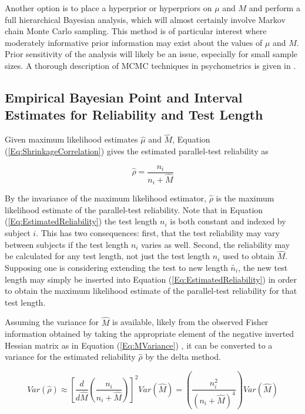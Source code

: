 \documentclass[12pt,epsfig]{article}
\begin{document}
 Another option is to place a hyperprior or hyperpriors on $\mu$ and $M$ and perform a full hierarchical Bayesian analysis, which will almost certainly involve Markov chain Monte Carlo sampling. This method is of particular interest where moderately informative prior information may exist about the values of $\mu$ and $M$. Prior sensitivity of the analysis will likely be an issue, especially for small sample sizes. A thorough description of MCMC techniques in psychometrics is given in \cite{Levy2016}.



\subsection{Empirical Bayesian Point and Interval Estimates for Reliability and Test Length}
\label{Subsec:IntervalFormulas}

Given maximum likelihood estimates $\hat{\mu}$ and $\hat{M}$, Equation (\ref{Eq:ShrinkageCorrelation}) gives the estimated parallel-test reliability as

\begin{equation}
    \hat{\rho} = \dfrac{n_i}{n_i + \hat{M}}
    \label{Eq:EstimatedReliability}
\end{equation}

\noindent By the invariance of the maximum likelihood estimator, $\hat{\rho}$ is the maximum likelihood estimate of the parallel-test reliability. Note that in Equation (\ref{Eq:EstimatedReliability}) the test length $n_i$ is both constant and indexed by subject $i$. This has two consequences: first, that the test reliability may vary between subjects if the test length $n_i$ varies as well. Second, the reliability may be calculated for any test length, not just the test length $n_i$ used to obtain $\hat{M}$. Supposing one is considering extending the test to new length $\tilde{n_i}$, the new test length may simply be inserted into Equation (\ref{Eq:EstimatedReliability})  in order to obtain the maximum likelihood estimate of the parallel-test reliability for that test length.

Assuming the variance for $\hat{M}$ is available, likely from the observed Fisher information obtained by taking the appropriate element of the negative inverted Hessian matrix as in Equation (\ref{Eq:MVariance}) , it can be converted to a variance for the estimated reliability $\hat{\rho}$ by the delta method.

\begin{equation*}
Var(\hat{\rho}) \approx \left[\dfrac{d}{d \hat{M}} \left(\dfrac{n_i}{n_i + \hat{M}}\right) \right]^2 Var(\hat{M}) = \left(\dfrac{n_i^2}{(n_i + \hat{M})^4}\right) Var(\hat{M})
\end{equation*}
\end{document}
